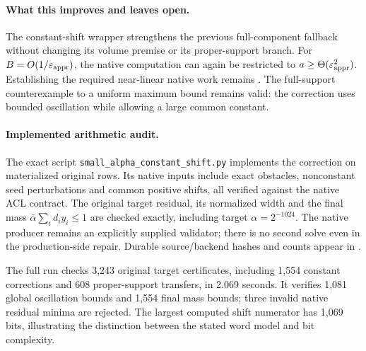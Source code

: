 \paragraph{What this improves and leaves open.}
The constant-shift wrapper strengthens the previous full-component
fallback without changing its volume premise or its proper-support
branch. For $B=O(1/\varepsilon_{\mathrm{appr}})$, the native computation can again be
restricted to $a\geq\Theta(\varepsilon_{\mathrm{appr}}^2)$. Establishing the required
near-linear native work remains \statusopen. The full-support
counterexample to a uniform maximum bound remains valid: the correction
uses bounded oscillation while allowing a large common constant.

\paragraph{Implemented arithmetic audit.}
The exact script \texttt{small\_alpha\_constant\_shift.py} implements
the correction on materialized original rows. Its native inputs include
exact obstacles, nonconstant seed perturbations and common positive
shifts, all verified against the native ACL contract. The original
target residual, its normalized width and the final mass
$\bar\alpha\sum_i d_i y_i\leq1$ are checked exactly, including target
$\alpha=2^{-1024}$. The native producer remains an explicitly supplied
validator; there is no second solve even in the production-side repair.
Durable source/backend hashes and counts appear in
.

The full run checks 3,243 original target certificates, including 1,554
constant corrections and 608 proper-support transfers, in 2.069 seconds.
It verifies 1,081 global oscillation bounds and 1,554 final mass bounds;
three invalid native residual minima are rejected. The largest computed
shift numerator has 1,069 bits, illustrating the distinction between the
stated word model and bit complexity.
